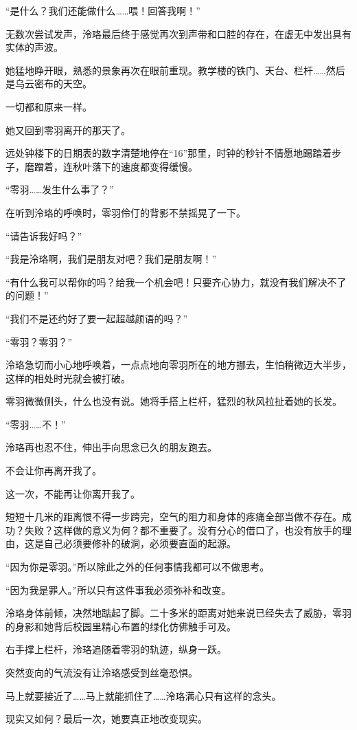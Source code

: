 \documentclass[UTF8, scheme = chinese, openany]{ctexbook}
\begin{document}
“是什么？我们还能做什么……喂！回答我啊！”

无数次尝试发声，泠珞最后终于感觉再次到声带和口腔的存在，在虚无中发出具有实体的声波。

她猛地睁开眼，熟悉的景象再次在眼前重现。教学楼的铁门、天台、栏杆……然后是乌云密布的天空。

一切都和原来一样。

她又回到零羽离开的那天了。

远处钟楼下的日期表的数字清楚地停在“16”那里，时钟的秒针不情愿地踢踏着步子，磨蹭着，连秋叶落下的速度都变得缓慢。

“零羽……发生什么事了？”

在听到泠珞的呼唤时，零羽伶仃的背影不禁摇晃了一下。

“请告诉我好吗？”

“我是泠珞啊，我们是朋友对吧？我们是朋友啊！”

“有什么我可以帮你的吗？给我一个机会吧！只要齐心协力，就没有我们解决不了的问题！”

“我们不是还约好了要一起超越颜语的吗？”

“零羽？零羽？”

泠珞急切而小心地呼唤着，一点点地向零羽所在的地方挪去，生怕稍微迈大半步，这样的相处时光就会被打破。

零羽微微侧头，什么也没有说。她将手搭上栏杆，猛烈的秋风拉扯着她的长发。

“零羽……不！”

泠珞再也忍不住，伸出手向思念已久的朋友跑去。

不会让你再离开我了。

这一次，不能再让你离开我了。

短短十几米的距离恨不得一步跨完，空气的阻力和身体的疼痛全部当做不存在。成功？失败？这样做的意义为何？都不重要了。没有分心的借口了，也没有放手的理由，这是自己必须要修补的破洞，必须要直面的起源。

“因为你是零羽。”所以除此之外的任何事情我都可以不做思考。

“因为我是罪人。”所以只有这件事我必须弥补和改变。

泠珞身体前倾，决然地踮起了脚。二十多米的距离对她来说已经失去了威胁，零羽的身影和她背后校园里精心布置的绿化仿佛触手可及。

右手撑上栏杆，泠珞追随着零羽的轨迹，纵身一跃。

突然变向的气流没有让泠珞感受到丝毫恐惧。

马上就要接近了……马上就能抓住了……泠珞满心只有这样的念头。

现实又如何？最后一次，她要真正地改变现实。
\end{document}
